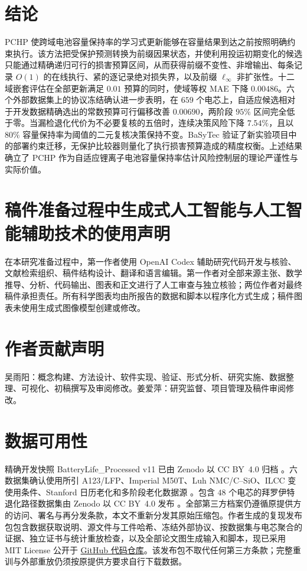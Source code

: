 \documentclass[UTF8,11pt]{ctexart}
\begin{document}
\section{结论}

PCHP 使跨域电池容量保持率的学习式更新能够在容量结果到达之前按照明确约束执行。该方法把受保护预测转换为前缀因果状态，并使利用投运初期变化的候选只能通过精确递归可行的损害预算区间，从而获得前缀不变性、非增输出、每条记录 $O(1)$ 的在线执行、紧的逐记录绝对损失界，以及前缀 $\ell_\infty$ 非扩张性。十二域嵌套评估在全部更新满足 $0.01$ 预算的同时，使域等权 MAE 下降 $0.00486$。六个外部数据集上的协议冻结确认进一步表明，在 $659$ 个电芯上，自适应候选相对于开发数据精确选出的常数预算可行偏移改善 $0.00690$，两阶段 $95\%$ 区间完全低于零。当漏检退化代价为不必要复核的五倍时，连续决策风险下降 $7.54\%$，且以 $80\%$ 容量保持率为阈值的二元复核决策保持不变。BaSyTec 验证了新实验项目中的部署约束迁移，无保护比较器则量化了执行损害预算造成的精度权衡。上述结果确立了 PCHP 作为自适应锂离子电池容量保持率估计风险控制层的理论严谨性与实际价值。

\section*{稿件准备过程中生成式人工智能与人工智能辅助技术的使用声明}

在本研究准备过程中，第一作者使用 OpenAI Codex 辅助研究代码开发与核验、文献检索组织、稿件结构设计、翻译和语言编辑。第一作者对全部来源主张、数学推导、分析、代码输出、图表和正文进行了人工审查与独立核验；两位作者对最终稿件承担责任。所有科学图表均由所报告的数据和脚本以程序化方式生成；稿件图表未使用生成式图像模型创建或修改。

\section*{作者贡献声明}

吴雨阳：概念构建、方法设计、软件实现、验证、形式分析、研究实施、数据整理、可视化、初稿撰写及审阅修改。姜爱萍：研究监督、项目管理及稿件审阅修改。

\section*{数据可用性}

精确开发快照 BatteryLife\_Processed v11 已由 Zenodo 以 CC BY~4.0 归档 \citep{batterylife2026processed}。六数据集确认使用所引 A123/LFP、Imperial M50T、Luh NMC/C--SiO、ILCC 变使用条件、Stanford 日历老化和多阶段老化数据源 \citep{wheeler2025lfp,kirkaldy2024comprehensive,luh2024dataset,li2024varyingusage,lam2025calendar,stroebl2024multistage}。包含 $48$ 个电芯的拜罗伊特退化路径数据集由 Zenodo 以 CC BY~4.0 发布 \citep{roder2025degradationdata}。全部第三方档案仍遵循原提供方的访问、署名与再分发条款，本文不重新分发其原始压缩包。作者生成的复现发布包包含数据获取说明、源文件与工件哈希、冻结外部协议、按数据集与电芯聚合的证据、独立证书与统计重放检查，以及全部论文图生成输入和脚本，现已采用 MIT License 公开于 \href{https://github.com/xiansuqiushui-dotcom/pchp-battery-capacity-retention}{GitHub 代码仓库}。该发布包不取代任何第三方条款；完整重训与外部重放仍须按原提供方要求自行下载数据。
\end{document}

